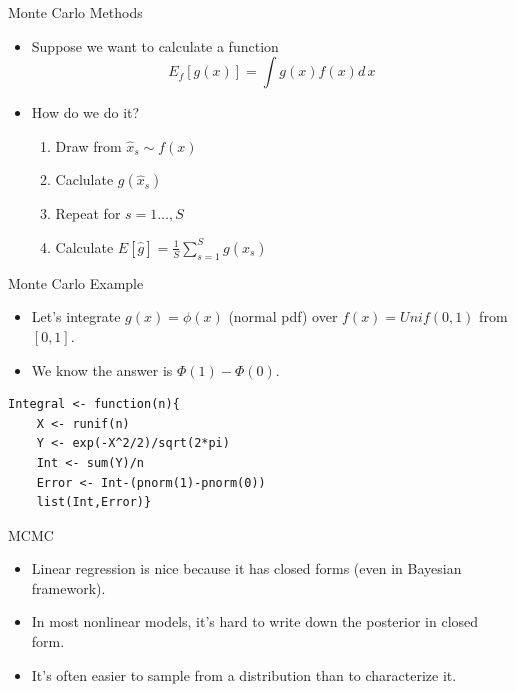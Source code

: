 \documentclass[aspectratio=169]{beamer}
\begin{document}
\begin{frame}{Monte Carlo Methods}
\begin{itemize}
\item Suppose we want to calculate a function 
$$E_f[g(x)] = \int g(x) f(x) d\,x$$
\item How do we do it?
\begin{enumerate}
\item Draw from $\hat{x}_s \sim f(x)$
\item Caclulate $g(\hat{x}_s)$
\item Repeat for $s=1\ldots,S$
\item Calculate $E[\hat{g}]=\frac{1}{S} \sum_{s=1}^S g(\hat{x}_s)$
\end{enumerate}
\end{itemize}
\end{frame}


\begin{frame}[fragile]{Monte Carlo Example}
\begin{itemize}
\item Let's integrate $g(x) = \phi(x)$ (normal pdf) over $f(x) = Unif(0,1)$ from $[0,1]$.
\item We know the answer is $\Phi(1) - \Phi(0)$.
\end{itemize}
\begin{verbatim}
Integral <- function(n){
    X <- runif(n)
    Y <- exp(-X^2/2)/sqrt(2*pi)
    Int <- sum(Y)/n
    Error <- Int-(pnorm(1)-pnorm(0))
    list(Int,Error)}
\end{verbatim}
\end{frame}

\begin{frame}{MCMC}
\begin{itemize}
\item Linear regression is nice because it has closed forms (even in Bayesian
framework).
\item In most nonlinear models, it's hard to write down the posterior in
closed form.
\item It's often easier to sample from a distribution than to characterize
it.
\end{itemize}
\end{frame}
\end{document}
